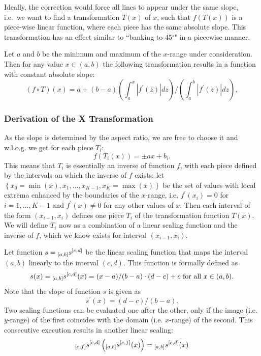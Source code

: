\documentclass[11pt]{isuthesis}\usepackage[]{graphicx}\usepackage[]{color}
\begin{document}
Ideally, the correction would force all lines to appear under the same slope, i.e.~we want to find a transformation $T(x)$ of $x$, such that $f(T(x))$ is a  piece-wise linear function, where each piece has the same absolute slope. This transformation has an effect similar to ``banking to 45$^\circ$" in a piecewise manner. 

Let $a$ and $b$ be the minimum and maximum of the $x$-range under consideration. Then for any value $x \in (a,b)$ the following transformation results in a function with constant absolute slope:
\begin{equation}\label{eqn.xtrans}
(f \circ T)(x) = a + (b-a)\left(\int_{a}^x |f^\prime(z)| dz\right)/\left(\int_{a}^{b}|f^\prime(z)| dz\right),
\end{equation}

\subsubsection{Derivation of the X Transformation}\label{app.xtrans}
As the slope is determined by the aspect ratio, we are free to choose it and w.l.o.g. we get for each piece $T_i$: 
\[
f(T_i(x)) = \pm a x + b_i.
\]
This means that $T_i$ is essentially an inverse of function $f$, with each piece defined by the   intervals on which the inverse of $f$ exists: let $\left\{x_0 = \min(x), x_1, ..., x_{K-1}, x_K = \max(x) \right\}$ be the set of values with local extrema enhanced by the boundaries of the $x$-range, i.e.  $f^\prime(x_i) = 0$ for  $i = 1, ... , K-1$ and $f^\prime(x) \neq 0$ for any other values of $x$. 
Then each interval of the form $(x_{i-1}, x_i)$ defines one piece $T_i$ of the transformation function $T(x)$. We will define $T_i$ now as a combination of a linear scaling function and the inverse of $f$, which we know exists for interval $(x_{i-1}, x_i)$.

Let function $s = {_{[a,b]}s^{ [c,d]}}$ be the linear scaling function that maps  the interval $(a,b)$ linearly to the interval $(c,d)$. This function is formally defined as
\[
s(x) = {_{[a,b]}s^{ [c,d]}} (x) = (x-a)/(b-a) \cdot (d-c) + c \text{ for all } x \in (a,b).
\]
Note that the slope of function $s$ is given as
\[
s^\prime(x) = (d-c)/(b-a).
\]
%
Two scaling functions can be evaluated one after the other, only if the image (i.e. $y$-range) of the first coincides with the domain (i.e. $x$-range) of the second. This consecutive execution results in another linear scaling: 
\[
{_{[e,f]}s^{ [c,d]}}  \left(  {_{[a,b]}s^{ [e,f]}}(x) \right) = {_{[a,b]}s^{ [c,d]}} (x)
\]
\end{document}
